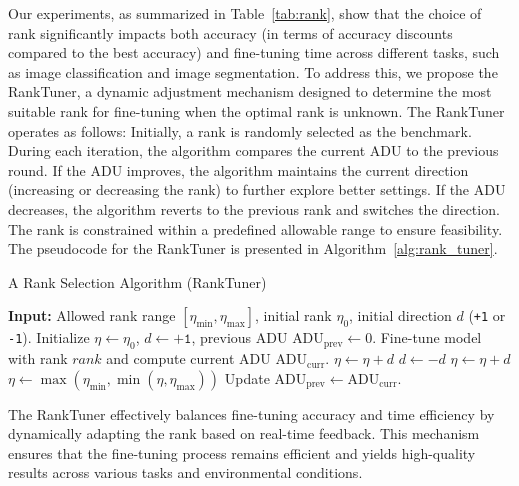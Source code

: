 Our experiments, as summarized in Table~\ref{tab:rank}, show that the choice of rank significantly impacts both accuracy (in terms of accuracy discounts compared to the best accuracy) and fine-tuning time across different tasks, such as image classification and image segmentation. To address this, we propose the RankTuner, a dynamic adjustment mechanism designed to determine the most suitable rank for fine-tuning when the optimal rank is unknown. The RankTuner operates as follows: Initially, a rank is randomly selected as the benchmark. During each iteration, the algorithm compares the current ADU to the previous round. If the ADU improves, the algorithm maintains the current direction (increasing or decreasing the rank) to further explore better settings. If the ADU decreases, the algorithm reverts to the previous rank and switches the direction. The rank is constrained within a predefined allowable range to ensure feasibility. The pseudocode for the RankTuner is presented in Algorithm~\ref{alg:rank_tuner}.

\begin{algorithm}
\caption{A Rank Selection Algorithm (RankTuner)}
\label{alg:rank_tuner}
\begin{algorithmic}[1]
\State \textbf{Input:} Allowed rank range $[\eta_{\text{min}}, \eta_{\text{max}}]$, initial rank $\eta_0$, initial direction $d$ (\texttt{+1} or \texttt{-1}).
\State Initialize $\eta \leftarrow \eta_0$, $d \leftarrow \texttt{+1}$, previous ADU $\text{ADU}_{\text{prev}} \leftarrow 0$.
    \State Fine-tune model with rank $rank$ and compute current ADU $\text{ADU}_{\text{curr}}$.
        \State $\eta \leftarrow \eta + d$ {}
    \Else
        \State $d \leftarrow -d$ {}
        \State $\eta \leftarrow \eta + d$ {}
    \EndIf
    \State $\eta \leftarrow \max(\eta_{\text{min}}, \min(\eta, \eta_{\text{max}}))$ 
    \State Update $\text{ADU}_{\text{prev}} \leftarrow \text{ADU}_{\text{curr}}$.
\EndFor
\end{algorithmic}
\end{algorithm}

The RankTuner 
effectively balances fine-tuning accuracy and time efficiency by dynamically adapting the rank based on real-time feedback. This mechanism ensures that the fine-tuning process remains efficient and yields high-quality results across various tasks and environmental conditions.



